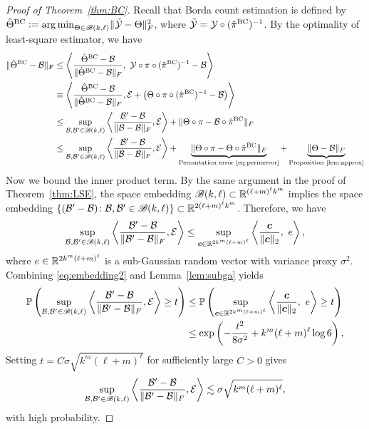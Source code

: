 \documentclass[12pt]{article}
\theoremstyle{definition}
\def\caliB{\mathscr{B}}
\begin{document}
\begin{proof}[Proof of Theorem~\ref{thm:BC}]
    Recall that Borda count estimation is defined by $\hat\Theta^{\textup{BC}} := \argmin_{\Theta\in\caliB(k,\ell)}\FnormSize{}{\tilde\tY-\Theta}^2$, where $\tilde{\mathcal{Y}} = \mathcal{Y}\circ(\hat\pi^{\textup{BC}})^{-1}$.
     By the optimality of least-square estimator, we have
\begin{align}
\FnormSize{}{\hat\Theta^\textup{BC} -\tB}&\leq \left\langle {\hat \Theta^\textup{BC}-\tB \over \FnormSize{}{ \hat \Theta^\textup{BC}-\tB}},\ \tY\circ\pi\circ(\hat\pi^{\textup{BC}})^{-1}-\tB \right \rangle\\ &\equiv \left\langle {\hat \Theta^\textup{BC}-\tB \over \FnormSize{}{ \hat \Theta^\textup{BC}-\tB}},\tE+
\left(\Theta\circ\pi\circ(\hat\pi^{\textup{BC}})^{-1}-\tB\right) \right \rangle \\
&\leq \sup_{\tB, \tB'\in \caliB(k,\ell)} \left\langle {\tB'-\tB \over \FnormSize{}{\tB-\tB}}, \tE \right \rangle+\FnormSize{}{\Theta\circ \pi-\tB\circ \hat\pi^{\textup{BC}}}\\&\leq \sup_{\tB, \tB'\in \caliB(k,\ell)} \left\langle {\tB'-\tB \over \FnormSize{}{\tB-\tB}}, \tE \right \rangle+\underbrace{\FnormSize{}{\Theta\circ \pi-\Theta\circ \hat\pi^{\textup{BC}}}}_{\textup{Permutation error \eqref{eq:permerror}}}+\underbrace{\FnormSize{}{\Theta-\tB}}_{\textup{Proposition~\ref{lem:approx}}}
\end{align}
Now we bound the inner product term. 
 By the same argument in the proof of Theorem~\ref{thm:LSE}, the space embedding $\caliB(k,\ell)\subset \bbR^{(\ell+m)^\ell k^m}$ implies the space embedding $\{(\tB'-\tB)\colon \tB, \tB'\in\caliB(k,\ell)\} \subset\bbR^{2(\ell+m)^\ell k^m}$.
Therefore, we have 
\begin{align}\label{eq:embedding2}
\sup_{\tB, \tB'\in \caliB(k,\ell)} \left\langle {\tB'-\tB \over \FnormSize{}{\tB'-\tB}}, \tE \right \rangle \leq \sup_{\mc\in \bbR^{2k^m(\ell+m)^\ell } }\left\langle {\mc\over \vnormSize{}{\mc}},\ e \right\rangle,
\end{align}
where  $e\in\mathbb{R}^{2k^m(\ell+m)^\ell}$ is a sub-Gaussian random vector with variance proxy $\sigma^2$. 
Combining \eqref{eq:embedding2} and Lemma~\ref{lem:subga} yields 
\begin{align}
    \mathbb{P}\left(\sup_{\tB, \tB'\in \caliB(k,\ell)} \left\langle {\tB'-\tB \over \FnormSize{}{\tB'-\tB}}, \tE \right \rangle\geq t\right)
    &\leq \mathbb{P}\left( \sup_{\mc\in \bbR^{2k^m(\ell+m)^\ell } }\left\langle {\mc\over \vnormSize{}{\mc}},\ e \right\rangle\geq t\right)\\&\leq \exp\left(-\frac{t^2}{8\sigma^2} +k^m(\ell+m)^\ell\log 6 \right),
\end{align}
Setting $t = C\sigma\sqrt{k^m(\ell+m)^\ell}$ for sufficiently large $C>0$ gives
\begin{align}\label{eq:nonparae}
    \sup_{\tB, \tB'\in \caliB(k,\ell)} \left\langle {\tB'-\tB \over \FnormSize{}{\tB'-\tB}}, \tE \right \rangle\lesssim \sigma\sqrt{k^m(\ell+m)^\ell},
\end{align}
with high probability.


\end{proof}
\end{document}
